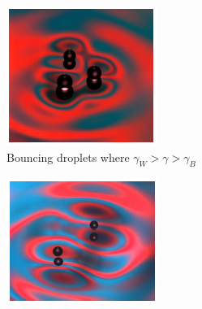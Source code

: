\begin{figure}[b]
    \centering
    \begin{subfigure}{0.32\textwidth}
        \includegraphics[width=\textwidth]{prototype/BouncingDropletExample.png}
        \caption{Bouncing droplets where $\gamma_W > \gamma > \gamma_B$}
        \label{fig:bouncingdroplets}
    \end{subfigure}
    \begin{subfigure}{0.32\textwidth}
        \includegraphics[width=\textwidth]{prototype/WalkingDropletExample.png}

\end{subfigure}
\end{figure}
